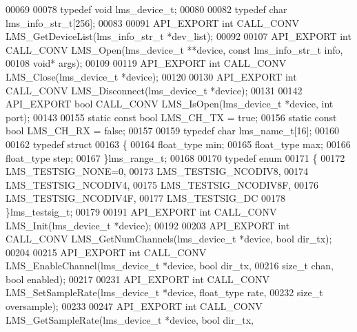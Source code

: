 \begin{DoxyCode}
00069 
00078 \textcolor{keyword}{typedef} \textcolor{keywordtype}{void} lms_device_t;
00080 
00082 \textcolor{keyword}{typedef} \textcolor{keywordtype}{char} lms_info_str_t[256];
00083 
00091 API_EXPORT \textcolor{keywordtype}{int} CALL_CONV LMS_GetDeviceList(lms\_info\_str\_t *dev\_list);
00092 
00107 API_EXPORT \textcolor{keywordtype}{int} CALL_CONV LMS_Open(lms\_device\_t **device, \textcolor{keyword}{const} lms\_info\_str\_t 
      info,
00108                                                          \textcolor{keywordtype}{void}* args);
00109 
00119 API_EXPORT \textcolor{keywordtype}{int} CALL_CONV LMS_Close(lms\_device\_t *device);
00120 
00130 API_EXPORT \textcolor{keywordtype}{int} CALL_CONV LMS_Disconnect(lms\_device\_t *device);
00131 
00142 API_EXPORT \textcolor{keywordtype}{bool} CALL_CONV LMS_IsOpen(lms\_device\_t *device, \textcolor{keywordtype}{int} port);
00143 
00155 \textcolor{keyword}{static} \textcolor{keyword}{const} \textcolor{keywordtype}{bool} LMS_CH_TX = \textcolor{keyword}{true};   
00156 \textcolor{keyword}{static} \textcolor{keyword}{const} \textcolor{keywordtype}{bool} LMS_CH_RX = \textcolor{keyword}{false};  
00157 
00159 \textcolor{keyword}{typedef} \textcolor{keywordtype}{char} lms_name_t[16];
00160 
00162 \textcolor{keyword}{typedef} \textcolor{keyword}{struct}
00163 \{
00164     float\_type min;     
00165     float\_type max;     
00166     float\_type step;    
00167 \}lms_range_t;
00168 
00170 \textcolor{keyword}{typedef} \textcolor{keyword}{enum}
00171 \{
00172     LMS_TESTSIG_NONE=0,     
00173     LMS_TESTSIG_NCODIV8,    
00174     LMS_TESTSIG_NCODIV4,    
00175     LMS_TESTSIG_NCODIV8F,   
00176     LMS_TESTSIG_NCODIV4F,   
00177     LMS_TESTSIG_DC          
00178 \}lms_testsig_t;
00179 
00191 API_EXPORT \textcolor{keywordtype}{int} CALL_CONV LMS_Init(lms\_device\_t *device);
00192 
00203 API_EXPORT \textcolor{keywordtype}{int} CALL_CONV LMS_GetNumChannels(lms\_device\_t *device, \textcolor{keywordtype}{bool} dir_tx);
00204 
00215 API_EXPORT \textcolor{keywordtype}{int} CALL_CONV LMS_EnableChannel(lms\_device\_t *device, \textcolor{keywordtype}{bool} dir_tx,
00216                                            \textcolor{keywordtype}{size\_t} chan, \textcolor{keywordtype}{bool} enabled);
00217 
00231 API_EXPORT \textcolor{keywordtype}{int} CALL_CONV LMS_SetSampleRate(lms\_device\_t *device, float\_type rate,
00232                                            \textcolor{keywordtype}{size\_t} oversample);
00233 
00247 API_EXPORT \textcolor{keywordtype}{int} CALL_CONV LMS_GetSampleRate(lms\_device\_t *device, \textcolor{keywordtype}{bool} dir_tx,

\end{DoxyCode}
